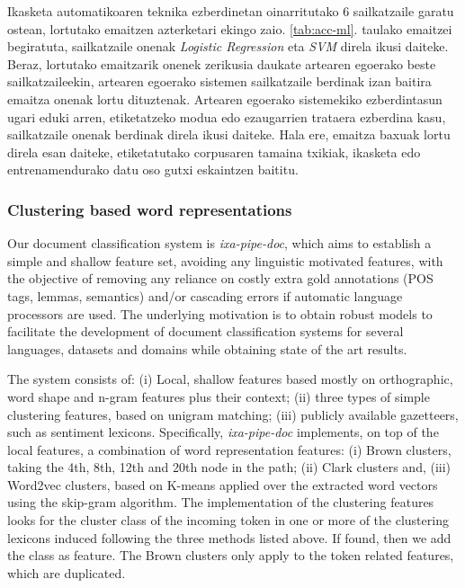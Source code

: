 \documentclass[information,article,submit,moreauthors,pdftex,10pt,a4paper]{Definitions/mdpi}
\begin{document}
Ikasketa automatikoaren teknika ezberdinetan oinarritutako 6 sailkatzaile garatu ostean, lortutako emaitzen azterketari ekingo zaio. \ref{tab:acc-ml}. taulako emaitzei begiratuta, sailkatzaile onenak \textit{Logistic Regression} eta \textit{SVM} direla ikusi daiteke. Beraz, lortutako emaitzarik onenek zerikusia daukate artearen egoerako beste sailkatzaileekin, artearen egoerako sistemen sailkatzaile berdinak izan baitira emaitza onenak lortu dituztenak. Artearen egoerako sistemekiko ezberdintasun ugari eduki arren, etiketatzeko modua edo ezaugarrien trataera ezberdina kasu, sailkatzaile onenak berdinak direla ikusi daiteke. Hala ere, emaitza baxuak lortu direla esan daiteke, etiketatutako corpusaren tamaina txikiak, ikasketa edo entrenamendurako datu oso gutxi eskaintzen baititu.


\subsubsection{Clustering based word representations}\label{sec:ixa}

Our document classification system is \emph{ixa-pipe-doc}, which aims to establish a simple and shallow feature set, avoiding any linguistic motivated features, with the objective of removing any reliance on costly extra gold annotations (POS tags, lemmas, semantics) and/or cascading errors if automatic language processors are used. The underlying motivation is to obtain robust models to facilitate the development of document classification systems for several languages, datasets and domains while obtaining state of the art results.

The system consists of: (i) Local, shallow features based mostly on orthographic, word shape and n-gram features plus their context; (ii) three types of simple clustering features, based on unigram matching; (iii) publicly available gazetteers, such as sentiment lexicons. Specifically, \emph{ixa-pipe-doc} implements, on top of the local features, a combination of word representation features: (i) Brown \cite{brown1992class} clusters, taking the 4th, 8th, 12th and 20th node in the path; (ii) Clark \cite{clark2003combining} clusters and, (iii) Word2vec \cite{mikolov2013distributed} clusters, based on K-means applied over the extracted word vectors using the skip-gram algorithm. The implementation of the clustering features looks for the cluster class of the incoming token in one or more of the clustering lexicons induced following the three methods listed above. If found, then we add the class as feature. The Brown clusters only apply to the token related features, which are duplicated.
\end{document}
